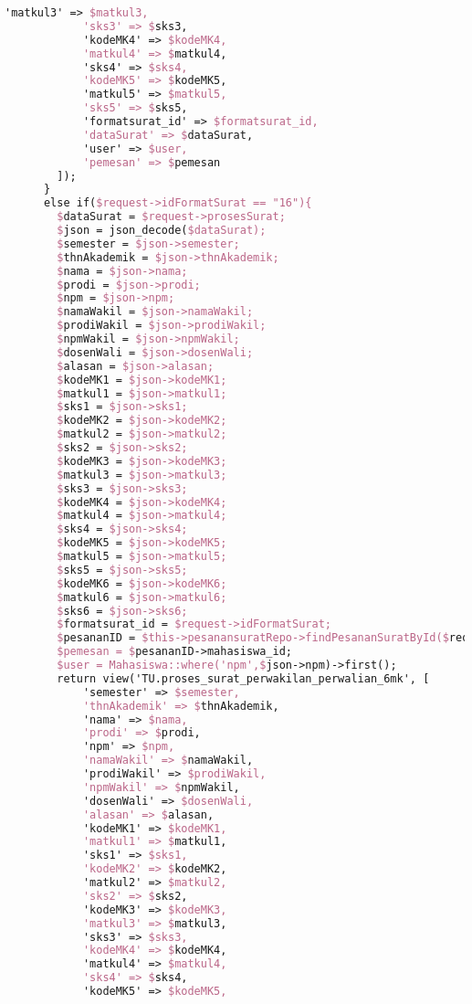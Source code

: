 \begin{lstlisting}[language=tex,basicstyle=\tiny,caption=PesanansuratController.php]
            'matkul3' => $matkul3,
            'sks3' => $sks3,
            'kodeMK4' => $kodeMK4,
            'matkul4' => $matkul4,
            'sks4' => $sks4,
            'kodeMK5' => $kodeMK5,
            'matkul5' => $matkul5,
            'sks5' => $sks5,
            'formatsurat_id' => $formatsurat_id,
            'dataSurat' => $dataSurat,
            'user' => $user,
            'pemesan' => $pemesan
        ]);
      }
      else if($request->idFormatSurat == "16"){
        $dataSurat = $request->prosesSurat;
        $json = json_decode($dataSurat);
        $semester = $json->semester;
        $thnAkademik = $json->thnAkademik;
        $nama = $json->nama;
        $prodi = $json->prodi;
        $npm = $json->npm;
        $namaWakil = $json->namaWakil;
        $prodiWakil = $json->prodiWakil;
        $npmWakil = $json->npmWakil;
        $dosenWali = $json->dosenWali;
        $alasan = $json->alasan;
        $kodeMK1 = $json->kodeMK1;
        $matkul1 = $json->matkul1;
        $sks1 = $json->sks1;
        $kodeMK2 = $json->kodeMK2;
        $matkul2 = $json->matkul2;
        $sks2 = $json->sks2;
        $kodeMK3 = $json->kodeMK3;
        $matkul3 = $json->matkul3;
        $sks3 = $json->sks3;
        $kodeMK4 = $json->kodeMK4;
        $matkul4 = $json->matkul4;
        $sks4 = $json->sks4;
        $kodeMK5 = $json->kodeMK5;
        $matkul5 = $json->matkul5;
        $sks5 = $json->sks5;
        $kodeMK6 = $json->kodeMK6;
        $matkul6 = $json->matkul6;
        $sks6 = $json->sks6;
        $formatsurat_id = $request->idFormatSurat;
        $pesananID = $this->pesanansuratRepo->findPesananSuratById($request->id);
        $pemesan = $pesananID->mahasiswa_id;
        $user = Mahasiswa::where('npm',$json->npm)->first();
        return view('TU.proses_surat_perwakilan_perwalian_6mk', [
            'semester' => $semester,
            'thnAkademik' => $thnAkademik,
            'nama' => $nama,
            'prodi' => $prodi,
            'npm' => $npm,
            'namaWakil' => $namaWakil,
            'prodiWakil' => $prodiWakil,
            'npmWakil' => $npmWakil,
            'dosenWali' => $dosenWali,
            'alasan' => $alasan,
            'kodeMK1' => $kodeMK1,
            'matkul1' => $matkul1,
            'sks1' => $sks1,
            'kodeMK2' => $kodeMK2,
            'matkul2' => $matkul2,
            'sks2' => $sks2,
            'kodeMK3' => $kodeMK3,
            'matkul3' => $matkul3,
            'sks3' => $sks3,
            'kodeMK4' => $kodeMK4,
            'matkul4' => $matkul4,
            'sks4' => $sks4,
            'kodeMK5' => $kodeMK5,

\end{lstlisting}
